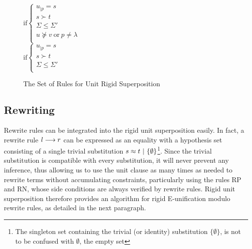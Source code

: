 \begin{figure}[htb]
\begin{center}
\doubleLine{}
\DP
$\text{if} \left\{\begin{array}{l}
u_{|p} = s\\
s \succ t\\
\Sigma \leq \Sigma'\\
u \not\succeq v ~ \text{or} ~ p \neq \lambda\\
\end{array}\right.$\\[12pt]

\doubleLine{}
\DP
$\text{if} \left\{\begin{array}{l}
u_{|p} = s\\
s \succ t\\
\Sigma \leq \Sigma'\\
\end{array}\right.$
\caption{The Set of Rules for Unit Rigid Superposition}
\label{fig:unit-sup-rules}
\end{center}
\end{figure}

\subsection{Rewriting}

Rewrite rules can be integrated into the rigid unit superposition easily. In
fact, a rewrite rule $l\longrightarrow{}r$ can be expressed as an equality with a
hypothesis set consisting of a single trivial substitution
$s\approx{}t ~|~ \{\emptyset\}$\footnote{The singleton set
containing the trivial (or identity) substitution $\{\emptyset\}$, is not to be
confused with $\emptyset$, the empty set}.  Since the trivial substitution is
compatible with every substitution, it will never prevent any inference, thus
allowing us to use the unit clause as many times as needed to rewrite terms
without accumulating constraints, particularly using the rules RP and RN, whose
side conditions are always verified by rewrite rules. Rigid unit superposition
therefore provides an algorithm for rigid E-unification modulo rewrite rules, as
detailed in the next paragraph.

